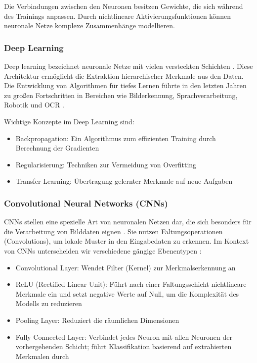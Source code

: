 Die Verbindungen zwischen den Neuronen besitzen Gewichte, die sich während des Trainings anpassen. Durch nichtlineare Aktivierungsfunktionen können neuronale Netze komplexe Zusammenhänge modellieren.

\subsubsection{Deep Learning}
\label{subsec:deep-learning}

Deep learning bezeichnet neuronale Netze mit vielen versteckten Schichten \parencite{RebalaGopinath2019AItM}. Diese Architektur ermöglicht die Extraktion hierarchischer Merkmale aus den Daten. Die Entwicklung von Algorithmen für tiefes Lernen führte in den letzten Jahren zu großen Fortschritten in Bereichen wie Bilderkennung, Sprachverarbeitung, Robotik und \gls{OCR} \parencite{jordan2015machine}.

Wichtige Konzepte im Deep Learning sind:

\begin{itemize}
	\item Backpropagation: Ein Algorithmus zum effizienten Training durch Berechnung der Gradienten \parencite{RebalaGopinath2019AItM}
	\item Regularisierung: Techniken zur Vermeidung von Overfitting \parencite{jordan2015machine}
	\item Transfer Learning: Übertragung gelernter Merkmale auf neue Aufgaben \parencite{jordan2015machine}
\end{itemize}

\subsubsection{Convolutional Neural Networks (CNNs)}
\label{subsubsec:cnn}

\glspl{CNN} stellen eine spezielle Art von neuronalen Netzen dar, die sich besonders für die Verarbeitung von Bilddaten eignen \parencite{RebalaGopinath2019AItM}. Sie nutzen Faltungsoperationen (Convolutions), um lokale Muster in den Eingabedaten zu erkennen. Im Kontext von \glspl{CNN} unterscheiden wir verschiedene gängige Ebenentypen \parencite{RebalaGopinath2019AItM}:

\begin{itemize}
	\item Convolutional Layer: Wendet Filter (Kernel) zur Merkmalserkennung an
	\item ReLU (Rectified Linear Unit): Führt nach einer Faltungsschicht nichtlineare Merkmale ein und setzt negative Werte auf Null, um die Komplexität des Modells zu reduzieren
	\item Pooling Layer: Reduziert die räumlichen Dimensionen
	\item Fully Connected Layer: Verbindet jedes Neuron mit allen Neuronen der vorhergehenden Schicht; führt Klassifikation basierend auf extrahierten Merkmalen durch
\end{itemize}

